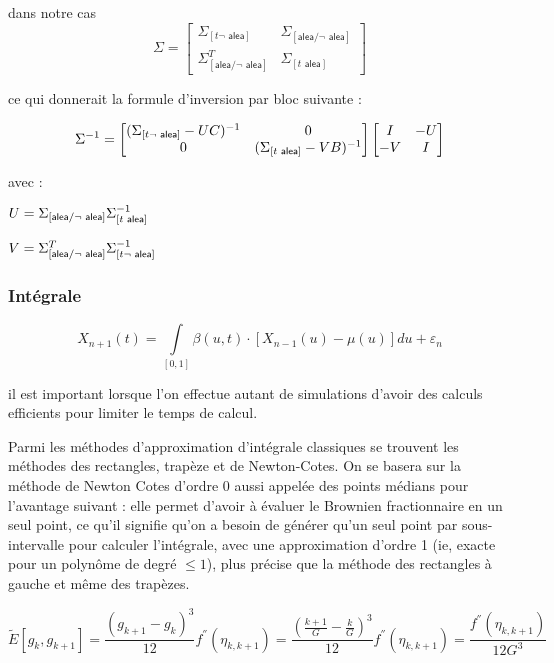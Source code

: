 dans notre cas 
$$\Sigma = \begin{bmatrix}
    \Sigma_{[t \neg\textsf{ alea}]} & \Sigma_{[\textsf{alea} / \neg \textsf{ alea}]}
    \\ \Sigma^T_{[\textsf{alea} / \neg \textsf{ alea}]}
     & \Sigma_{[t \textsf{ alea}]} 
\end{bmatrix}$$

ce qui donnerait la formule d'inversion par bloc suivante :

$$
\Sigma ^ {-1}
=
\begin{bmatrix}
    (\Sigma_{[t \neg\textsf{ alea}]} - UC) ^ {-1} & 0 \\
    0 & (\Sigma_{[t \textsf{ alea}]} - VB) ^ {-1}
    \end{bmatrix}
    \begin{bmatrix}
    I & - U \\
    - V & I
    \end{bmatrix}
$$

avec : 

$U = \Sigma_{[\textsf{alea} / \neg \textsf{ alea}]} \Sigma_{[t \textsf{ alea}]} ^ {-1} $

$V = \Sigma^T_{[\textsf{alea} / \neg \textsf{ alea}]} \Sigma_{[t \neg\textsf{ alea}]} ^ {-1}$

\subsubsection{Intégrale}

$$X_{n+1}(t) = \int\limits_{[0,1]} \beta(u,t) \cdot \left[ X_{n-1}(u) - \mu(u)\right]du + \varepsilon_n$$

il est important lorsque l'on effectue autant de simulations d'avoir des calculs efficients pour limiter le temps de calcul.

Parmi les méthodes d'approximation d'intégrale classiques se trouvent les méthodes des rectangles, trapèze et de Newton-Cotes. On se basera sur la méthode de Newton Cotes d'ordre 0 aussi appelée des points médians pour l'avantage suivant : elle permet d'avoir à évaluer le Brownien fractionnaire en un seul point, ce qu'il signifie qu'on a besoin de générer qu'un seul point par sous-intervalle pour calculer l'intégrale, avec une approximation d'ordre 1 (ie, exacte pour un polynôme de degré $\leq 1$), plus précise que la méthode des rectangles à gauche et même des trapèzes.

$$\tilde E[g_{k}, g_{k+1}] = \frac{(g_{k+1}-g_k)^3}{12}f ^{''}(\eta_{k,k+1}) = \frac{(\frac{k+1} G - \frac k G )^3}{12}f ^{''}(\eta_{k,k+1}) = \frac{f ^{''}(\eta_{k,k+1})}{12G^3}$$


